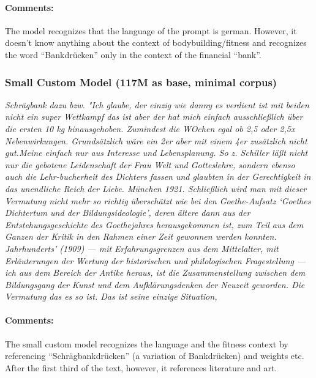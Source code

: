 \documentclass{scrartcl}
\begin{document}
\paragraph{Comments:}
The model recognizes that the language of the prompt is german. However, it doesn't know anything about the context of bodybuilding/fitness and recognizes the word \enquote{Bankdrücken} only in the context of the financial \enquote{bank}. 

\subsubsection{Small Custom Model (117M as base, minimal corpus)}
{\itshape
 Schrägbank dazu bzw.
"Ich glaube, der einzig wie danny es verdient ist mit beiden nicht ein super Wettkampf das ist aber der hat mich einfach ausschließlich über die ersten 10 kg hinausgehoben.
Zumindest die WOchen egal ob 2,5 oder 2,5x Nebenwirkungen.
Grundsätzlich wäre ein 2er aber mit einem 4er zusätzlich nicht gut.Meine einfach nur aus Interesse und Lebensplanung.
So z.
Schiller läßt nicht nur die gebotene Leidenschaft der Frau Welt und Gotteslehre, sondern ebenso auch die Lehr-bucherheit des Dichters fassen und glaubten in der Gerechtigkeit in das unendliche Reich der Liebe.
München 1921.
Schließlich wird man mit dieser Vermutung nicht mehr so richtig überschätzt wie bei den Goethe-Aufsatz ‘Goethes Dichtertum und der Bildungsideologie’, deren ältere dann aus der Entstehungsgeschichte des Goethejahres herausgekommen ist, zum Teil aus dem Ganzen der Kritik in den Rahmen einer Zeit gewonnen werden konnten.
Jahrhunderts’ (1909) — mit Erfahrungsgrenzen aus dem Mittelalter, mit Erläuterungen der Wertung der historischen und philologischen Fragestellung — ich aus dem Bereich der Antike heraus, ist die Zusammenstellung zwischen dem Bildungsgang der Kunst und dem Aufklärungsdenken der Neuzeit geworden.
Die Vermutung das es so ist.
Das ist seine einzige Situation,
}
\paragraph{Comments:}
The small custom model recognizes the language and the fitness context by referencing \enquote{Schrägbankdrücken} (a variation of Bankdrücken) and weights etc. After the first third of the text, however, it references literature and art.
\end{document}

